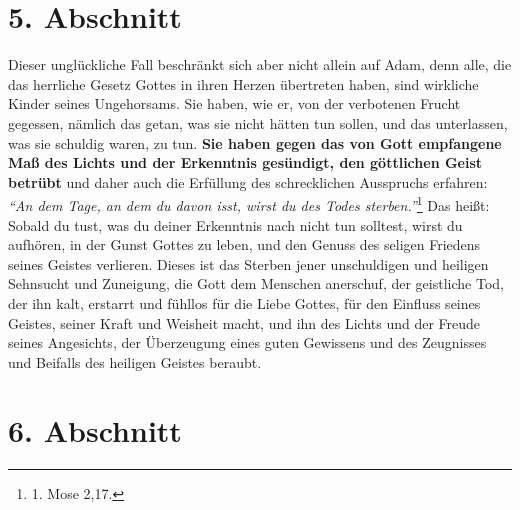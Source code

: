 \section{5. Abschnitt} \label{kap7_ab5}

Dieser unglückliche Fall beschränkt sich aber nicht allein auf Adam, denn alle,
die das herrliche Gesetz Gottes in ihren Herzen übertreten haben, sind wirkliche
Kinder seines Ungehorsams. Sie haben, wie er, von der verbotenen
Frucht
gegessen, nämlich das getan, was sie nicht hätten tun sollen, und das
unterlassen, was sie schuldig waren, zu tun. \textbf{Sie haben gegen das von
Gott
empfangene Maß des Lichts und der Erkenntnis gesündigt, den göttlichen Geist
betrübt} und daher auch die Erfüllung des schrecklichen Ausspruchs erfahren:
\textit{"`An dem Tage, an dem du davon isst, wirst du des Todes
sterben."'}\footnote{1. Mose 2,17.}
Das heißt: Sobald du tust, was du deiner Erkenntnis nach nicht tun
solltest, wirst du aufhören, in der Gunst Gottes zu
leben, und den Genuss des
seligen Friedens seines Geistes verlieren. Dieses ist das
Sterben jener
unschuldigen und heiligen Sehnsucht und Zuneigung, die Gott dem Menschen
anerschuf, der geistliche Tod, der ihn kalt, erstarrt und
fühllos für die Liebe
Gottes, für den Einfluss seines Geistes, seiner Kraft und
Weisheit macht, und ihn
des Lichts und der Freude seines Angesichts, der Überzeugung eines guten
Gewissens und des Zeugnisses und Beifalls des heiligen Geistes beraubt.

\section{6. Abschnitt} \label{kap7_ab6}

